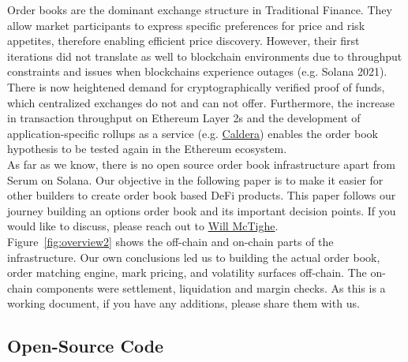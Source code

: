 \documentclass{article}
\begin{document}
\noindent Order books are the dominant exchange structure in Traditional Finance. They allow market participants to express specific preferences for price and risk appetites, therefore enabling efficient price discovery. However, their first iterations did not translate as well to blockchain environments due to throughput constraints and issues when blockchains experience outages (e.g. Solana 2021). There is now heightened demand for cryptographically verified proof of funds, which centralized exchanges do not and can not offer. Furthermore, the increase in transaction throughput on Ethereum Layer 2s and the development of application-specific rollups as a service (e.g. \href{https://twitter.com/calderaxyz}{Caldera}) enables the order book hypothesis to be tested again in the Ethereum ecosystem. \\

\noindent As far as we know, there is no open source order book infrastructure apart from Serum on Solana. Our objective in the following paper is to make it easier for other builders to create order book based DeFi products. This paper follows our journey building an options order book and its important decision points. If you would like to discuss, please reach out to \href{https://twitter.com/WillMcTighe}{Will McTighe}. \\


\noindent Figure~\ref{fig:overview2} shows the off-chain and on-chain parts of the infrastructure. Our own conclusions led us to building the actual order book, order matching engine, mark pricing, and volatility surfaces off-chain. The on-chain components were settlement, liquidation and margin checks. As this is a working document, if you have any additions, please share them with us. \\

\subsection{Open-Source Code}
\end{document}
